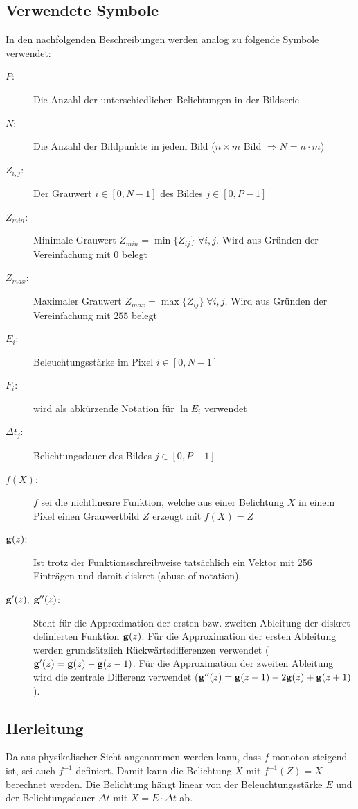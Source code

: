 \subsection{Verwendete Symbole}
In den nachfolgenden Beschreibungen werden analog zu \cite{paper} folgende Symbole verwendet:
\begin{description}
\item[$P$:] Die Anzahl der unterschiedlichen Belichtungen in der Bildserie
\item[$N$:] Die Anzahl der Bildpunkte in jedem Bild ($n \times m$ Bild $\Rightarrow N = n \cdot m$)
\item[$Z_{i,j}$:] Der Grauwert $i \in [0, N-1]$ des Bildes $j \in [0, P-1]$
\item[$Z_{min}$:] Minimale Grauwert $Z_{min} = \min \{Z_{ij}\} \; \forall i,j$. Wird aus Gründen der Vereinfachung mit $0$ belegt
\item[$Z_{max}$:] Maximaler Grauwert $Z_{max} = \max \{Z_{ij}\} \; \forall i,j$. Wird aus Gründen der Vereinfachung mit $255$ belegt
\item[$E_i$:] Beleuchtungsstärke im Pixel $i \in [0, N-1]$ 
\item[$F_i$:] wird als abkürzende Notation für $\ln E_i$ verwendet
\item[$\Delta t_j$:] Belichtungsdauer des Bildes $j \in [0, P-1]$
\item[$f(X)$:] $f$ sei die nichtlineare Funktion, welche aus einer Belichtung $X$ in einem Pixel einen Grauwertbild $Z$ erzeugt mit $f(X) = Z$
\item[$\mathbf g(z)$:] Ist trotz der Funktionsschreibweise tatsächlich ein Vektor mit 256 Einträgen und damit diskret (abuse of notation).
\item[$\mathbf{g}'(z), \; \mathbf{g}''(z) $:] Steht für die Approximation der ersten bzw. zweiten Ableitung der diskret definierten Funktion $\mathbf g(z)$. Für die Approximation der ersten Ableitung werden grundsätzlich Rückwärtsdifferenzen verwendet ($\mathbf g'(z) = \mathbf g(z) - \mathbf g(z-1)$. Für die Approximation der zweiten Ableitung wird die zentrale Differenz verwendet ($ \mathbf g''(z) = \mathbf g(z-1)-2\mathbf g(z)+\mathbf g(z+1)$).\\

\end{description}

\subsection{Herleitung}
Da aus physikalischer Sicht angenommen werden kann, dass $f$ monoton steigend ist, sei auch $f^{-1}$ definiert. Damit kann die Belichtung $X$ mit $f^{-1}(Z) = X$ berechnet werden. Die Belichtung hängt linear von der Beleuchtungsstärke $E$ und der Belichtungsdauer $\Delta t$ mit $X = E \cdot \Delta t$ ab.

